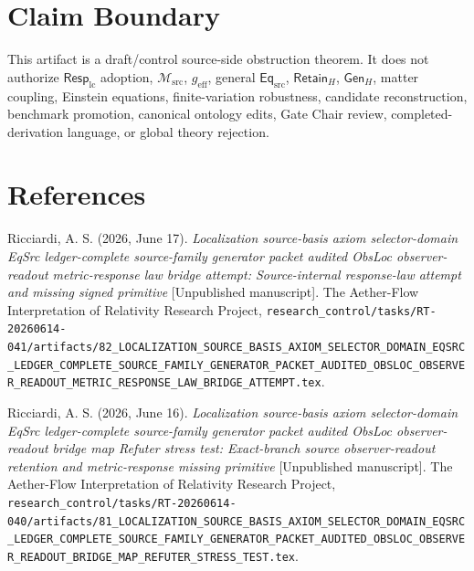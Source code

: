 \documentclass[11pt]{article}
\newcommand{\EqSrc}{\mathsf{Eq}_{\mathrm{src}}}
\newcommand{\RetainH}{\mathsf{Retain}_{H}}
\newcommand{\GenH}{\mathsf{Gen}_{H}}
\newcommand{\Msrc}{\mathcal{M}_{\mathrm{src}}}
\newcommand{\RespLC}{\mathsf{Resp}_{\mathrm{lc}}}
\newcommand{\geff}{g_{\mathrm{eff}}}
\begin{document}
\section{Claim Boundary}

This artifact is a draft/control source-side obstruction theorem. It
does not authorize \(\RespLC\) adoption, \(\Msrc\), \(\geff\), general
\(\EqSrc\), \(\RetainH\), \(\GenH\), matter coupling, Einstein
equations, finite-variation robustness, candidate reconstruction,
benchmark promotion, canonical ontology edits, Gate Chair review,
completed-derivation language, or global theory rejection.

\section*{References}

Ricciardi, A. S. (2026, June 17). \textit{Localization source-basis
axiom selector-domain EqSrc ledger-complete source-family generator
packet audited ObsLoc observer-readout metric-response law bridge
attempt: Source-internal response-law attempt and missing signed
primitive} [Unpublished manuscript]. The Aether-Flow Interpretation
of Relativity Research Project,
\texttt{research\_control/tasks/RT-20260614-041/artifacts/82\_LOCALIZATION\_SOURCE\_BASIS\_AXIOM\_SELECTOR\_DOMAIN\_EQSRC\_LEDGER\_COMPLETE\_SOURCE\_FAMILY\_GENERATOR\_PACKET\_AUDITED\_OBSLOC\_OBSERVER\_READOUT\_METRIC\_RESPONSE\_LAW\_BRIDGE\_ATTEMPT.tex}.

Ricciardi, A. S. (2026, June 16). \textit{Localization source-basis
axiom selector-domain EqSrc ledger-complete source-family generator
packet audited ObsLoc observer-readout bridge map Refuter stress test:
Exact-branch source observer-readout retention and metric-response
missing primitive} [Unpublished manuscript]. The Aether-Flow
Interpretation of Relativity Research Project,
\texttt{research\_control/tasks/RT-20260614-040/artifacts/81\_LOCALIZATION\_SOURCE\_BASIS\_AXIOM\_SELECTOR\_DOMAIN\_EQSRC\_LEDGER\_COMPLETE\_SOURCE\_FAMILY\_GENERATOR\_PACKET\_AUDITED\_OBSLOC\_OBSERVER\_READOUT\_BRIDGE\_MAP\_REFUTER\_STRESS\_TEST.tex}.
\end{document}
